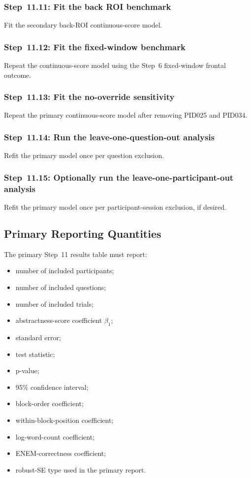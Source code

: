 \subsubsection{Step~11.11: Fit the back ROI benchmark}
Fit the secondary back-ROI continuous-score model.

\subsubsection{Step~11.12: Fit the fixed-window benchmark}
Repeat the continuous-score model using the Step~6 fixed-window frontal outcome.

\subsubsection{Step~11.13: Fit the no-override sensitivity}
Repeat the primary continuous-score model after removing PID025 and PID034.

\subsubsection{Step~11.14: Run the leave-one-question-out analysis}
Refit the primary model once per question exclusion.

\subsubsection{Step~11.15: Optionally run the leave-one-participant-out analysis}
Refit the primary model once per participant-session exclusion, if desired.

\subsection{Primary Reporting Quantities}
The primary Step~11 results table must report:
\begin{itemize}
    \item number of included participants;
    \item number of included questions;
    \item number of included trials;
    \item abstractness-score coefficient \(\beta_1\);
    \item standard error;
    \item test statistic;
    \item p-value;
    \item 95\% confidence interval;
    \item block-order coefficient;
    \item within-block-position coefficient;
    \item log-word-count coefficient;
    \item ENEM-correctness coefficient;
    \item robust-SE type used in the primary report.
\end{itemize}

